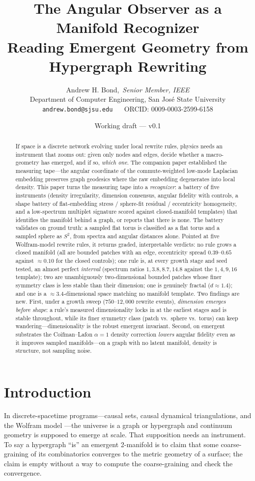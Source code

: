 \documentclass[11pt]{article}
\title{\textbf{The Angular Observer as a Manifold Recognizer}\\[2pt]
\large Reading Emergent Geometry from Hypergraph Rewriting}
\author{Andrew H. Bond,~\emph{Senior Member, IEEE}\\
Department of Computer Engineering, San Jos\'e State University\\
\texttt{andrew.bond@sjsu.edu} ~\textbar~ ORCID: 0009-0003-2599-6158}
\date{Working draft --- v0.1}
\begin{document}
\maketitle

\begin{abstract}
If space is a discrete network evolving under local rewrite rules, physics
needs an instrument that zooms out: given only nodes and edges, decide whether
a macro-geometry has emerged, and if so, \emph{which one}. The companion paper
\cite{kta} established the measuring tape---the angular coordinate of the
commute-weighted low-mode Laplacian embedding preserves graph geodesics where
the raw embedding degenerates into local density. This paper turns the
measuring tape into a \emph{recognizer}: a battery of five instruments
(density irregularity, dimension consensus, angular fidelity with controls, a
shape battery of flat-embedding stress / sphere-fit residual / eccentricity
homogeneity, and a low-spectrum multiplet signature scored against
closed-manifold templates) that identifies the manifold behind a graph, or
reports that there is none. The battery validates on ground truth: a sampled
flat torus is classified as a flat torus and a sampled sphere as $S^2$, from
spectra and angular distances alone. Pointed at five Wolfram-model rewrite
rules, it returns graded, interpretable verdicts: no rule grows a closed
manifold (all are bounded patches with an edge, eccentricity spread
$0.39$--$0.65$ against $\approx0.10$ for the closed controls); one rule is,
at every growth stage and seed tested, an almost perfect \emph{interval}
(spectrum ratios $1,3.8,8.7,14.8$ against the $1,4,9,16$ template); two are
unambiguously two-dimensional bounded patches whose finer symmetry class is
less stable than their dimension; one is genuinely fractal ($d\approx1.4$);
and one is a $\approx3.4$-dimensional space matching no manifold template. Two findings are
new. First, under a growth sweep ($750$--$12{,}000$ rewrite events),
\emph{dimension emerges before shape}: a rule's measured dimensionality locks
in at the earliest stages and is stable throughout, while its finer symmetry
class (patch vs.\ sphere vs.\ torus) can keep wandering---dimensionality is
the robust emergent invariant. Second, on emergent substrates the
Coifman--Lafon $\alpha{=}1$ density correction \emph{lowers} angular fidelity
even as it improves sampled manifolds---on a graph with no latent manifold,
density is structure, not sampling noise.
\end{abstract}

\section{Introduction}\label{sec:intro}
In discrete-spacetime programs---causal sets, causal dynamical triangulations,
and the Wolfram model \cite{wolfram2020,gorard2020}---the universe is a graph
or hypergraph and continuum geometry is supposed to emerge at scale. That
supposition needs an instrument. To say a hypergraph ``is'' an emergent
2-manifold is to claim that some coarse-graining of its combinatorics
converges to the metric geometry of a surface; the claim is empty without a
way to compute the coarse-graining and check the convergence.
\end{document}
